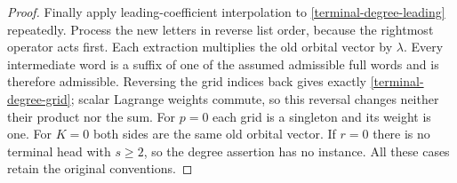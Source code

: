\begin{proof}
Finally apply leading-coefficient interpolation to
\eqref{terminal-degree-leading} repeatedly.  Process the new
letters in reverse list order, because the rightmost operator
acts first.  Each extraction multiplies the old orbital vector
by $\lambda$.  Every intermediate word is a suffix of one of
the assumed admissible full words and is therefore admissible.
Reversing the grid indices back gives exactly
\eqref{terminal-degree-grid}; scalar Lagrange weights commute,
so this reversal changes neither their product nor the sum.
For $p=0$ each grid is a singleton and its weight is one.  For
$K=0$ both sides are the same old orbital vector.  If $r=0$
there is no terminal head with $s\ge2$, so the degree assertion
has no instance.  All these cases retain the original conventions.
\end{proof}
